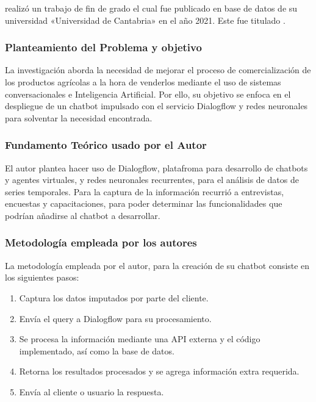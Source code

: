 \citeauthor{ts_CDRNRMPC} realizó un trabajo de fin de grado el cual fue publicado en base de datos de su universidad «Universidad de Cantabria» en el año 2021. 
Este fue titulado .

\subsubsection{Planteamiento del Problema y objetivo }

La investigación aborda la necesidad de mejorar el proceso de comercialización de los productos agrícolas a la hora de venderlos mediante el uso de sistemas conversacionales e Inteligencia Artificial. Por ello, su objetivo se enfoca en el despliegue de un chatbot impulsado con el servicio Dialogflow y redes neuronales para solventar la necesidad encontrada.

\subsubsection{Fundamento Teórico usado por el Autor}

El autor plantea hacer uso de Dialogflow, platafroma para desarrollo de chatbots y agentes virtuales, y redes neuronales recurrentes, para el análisis de datos de series temporales. Para la captura de la información recurrió a entrevistas, encuestas y capacitaciones, para poder determinar las funcionalidades que podrían añadirse al chatbot a desarrollar.

\subsubsection{Metodología empleada por los autores}
La metodología empleada por el autor, para la creación de su chatbot consiste en los siguientes pasos: 

\begin{enumerate}
    \item Captura los datos imputados por parte del cliente.
    \item Envía el query a Dialogflow para su procesamiento.
    \item Se procesa la información mediante una API externa y el código implementado, así como la base de datos.
    \item Retorna los resultados procesados y se agrega información extra requerida.
    \item Envía al cliente o usuario la respuesta.
\end{enumerate}

